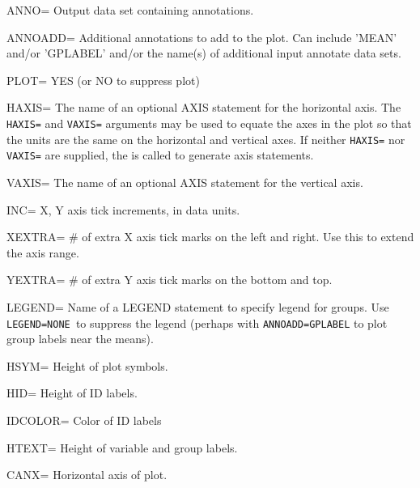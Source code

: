 \begin{proglist}
\item[ANNO=] Output data set containing annotations. 

\item[ANNOADD=] Additional annotations to add to the plot.  Can include
'MEAN' and/or 'GPLABEL' and/or the name(s) of additional
input annotate data sets. 

\item[PLOT=] YES (or NO to suppress plot) 

\item[HAXIS=] The name of an optional AXIS statement for 
the horizontal axis. The \texttt{HAXIS=} and \texttt{VAXIS=} arguments may be used
to equate the axes in the plot so that the units are the same
on the horizontal and vertical axes.  If neither \texttt{HAXIS=} nor
\texttt{VAXIS=} are supplied, the  is called to generate
axis statements.

\item[VAXIS=] The name of an optional AXIS statement for 
the  vertical axis.

\item[INC=] X, Y axis tick increments, in data units. 

\item[XEXTRA=] \# of extra X axis tick marks on the left and right.  Use this to
extend the axis range. 

\item[YEXTRA=] \# of extra Y axis tick marks on the bottom and top. 

\item[LEGEND=] Name of a LEGEND statement to specify legend for groups.  Use
\texttt{LEGEND=NONE }to suppress the legend (perhaps with \texttt{ANNOADD=GPLABEL}
to plot group labels near the means).

\item[HSYM=] Height of plot symbols. 

\item[HID=] Height of ID labels. 

\item[IDCOLOR=] Color of ID labels

\item[HTEXT=] Height of variable and group labels. 

\item[CANX=] Horizontal axis of plot. 


\end{proglist}
